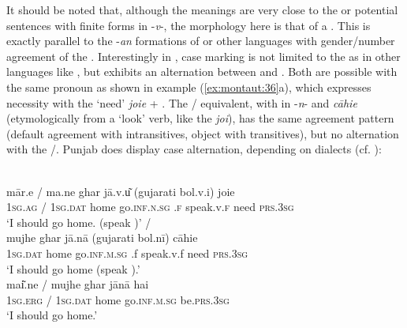 \documentclass[output=paper]{langsci/langscibook}
\begin{document}
It should be noted that, although the meanings are very close to the   or potential sentences with finite forms in -\textit{v}{}-, the morphology here is that of a . This is exactly parallel to the -\textit{an} formations of  or other languages with gender/number agreement of the . Interestingly in , case marking is not limited to the  as in other  languages like , but exhibits an alternation between  and . Both are possible with the same pronoun as shown in example (\ref{ex:montaut:36}a), which expresses necessity with the ‘need’  \textit{joie} + . The / equivalent, with  in -\textit{n}{}- and \textit{cāhie} (etymologically from a ‘look’ verb, like the  \textit{joi}), has the same agreement pattern (default agreement with intransitives, object with transitives), but no alternation with the /. Punjab  does display case alternation, depending on dialects (cf. \citealt{Khokhlova2013}):

\noindent\parbox{\textwidth}{\ea\label{ex:montaut:36}
\ea 
{}\\
\gll mār.e  /  ma.ne ghar  jā.v.u͂        (gujarati bol.v.i)  joie\\
{\textsc{1sg.}}\textsc{ag}  / \textsc{1sg}.\textsc{dat} home go.\textsc{inf.n.sg}   .\textsc{f} speak.v.\textsc{f} need \textsc{prs.3sg} \\
\glt ‘I should go home. (speak )’ \citep{Cardona2003}
\ex  
{}\slash{}\\
\gll mujhe ghar  jā.nā            (gujarati bol.nī) cāhie\\
\textsc{1sg}.\textsc{dat} home   go.\textsc{inf.m.sg} .f speak.v.f  need \textsc{prs.3sg} \\
\glt ‘I should go home (speak ).’ 
\ex    
{}\\
\gll mai͂.ne  /  mujhe  ghar jānā  hai  \\
{\textsc{1sg.}}\textsc{erg} /  \textsc{1sg}.\textsc{dat} home go.\textsc{inf.m.sg} be.\textsc{prs.3sg} \\
\glt ‘I should go home.’ 
\z 
\z}
\end{document}
